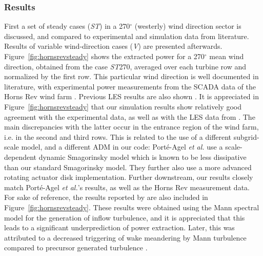 		\subsubsection{Results}
		First a set of steady cases (\emph{ST}) in a 270$^\circ$ (westerly) wind direction sector is discussed, and compared to experimental
		and simulation data from literature. Results of variable wind-direction cases  (\emph{V}) are presented afterwards.
		Figure~\ref{fig:hornsrevsteady} shows the extracted power for a 270$^\circ$ mean wind direction, obtained from the case \emph{ST}270,
		averaged over each turbine row and normalized by the first row. This particular wind direction is well documented in literature, with
		experimental power measurements from the SCADA data of the Horns Rev wind farm \citep{barthelmie2009modelling,barthelmie2010quantifying}. Previous LES results are also shown  \cite{ivanell2009numerical,porte2013numerical}. It is appreciated in Figure~\ref{fig:hornsrevsteady} that our simulation results show relatively good agreement with the experimental data, as well as with the LES data from \cite{porte2013numerical}. The main discrepancies with the latter occur in the entrance region of the wind farm, i.e. in the second and third rows. This is related to the use of a different subgrid-scale model, and a different ADM in our code: Port\'e-Agel \emph{et al.} use a scale-dependent dynamic Smagorinsky model which is known to be less dissipative than our standard Smagorinsky model. They further also use a more advanced rotating actuator disk implementation. Further downstream, our results closely match Port\'e-Agel \emph{et al.}'s results, as well as the Horns Rev measurement data. For sake of reference, the results reported by \cite{ivanell2009numerical} are also included in Figure~\ref{fig:hornsrevsteady}. These results were obtained using the Mann spectral model for the generation of inflow turbulence, and it is appreciated that this leads to a significant underprediction of power extraction. Later, this was attributed to a decreased triggering of wake meandering by Mann turbulence compared to precursor generated turbulence \citep{churchfield2012large}. 
		
